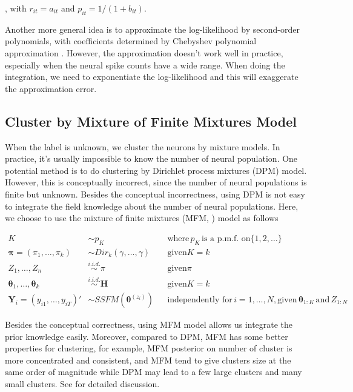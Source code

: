 \documentclass{article}
\begin{document}
	, with $r_{it} = a_{it}$ and $p_{it} = 1/(1 + b_{it})$.
	
	Another more general idea is to approximate the log-likelihood by second-order polynomials, with coefficients determined by Chebyshev polynomial approximation \citet{Keeley2019}. However, the approximation doesn’t work well in practice, especially when the neural spike counts have a wide range. When doing the integration, we need to exponentiate the log-likelihood and this will exaggerate the approximation error.
	
	\subsection{Cluster by Mixture of Finite Mixtures Model}
	When the label is unknown, we cluster the neurons by mixture models. In practice, it’s usually impossible to know the number of neural population. One potential method is to do clustering by Dirichlet process mixtures (DPM) model. However, this is conceptually incorrect, since the number of neural populations is finite but unknown. Besides the conceptual incorrectness, using DPM is not easy to integrate the field knowledge about the number of neural populations. Here, we choose to use the mixture of finite mixtures (MFM, \citet{Miller2018}) model as follows
	
	\begin{align*}
		K &\sim p_K &&\text{where}\, p_K \, \text{is a p.m.f. on} \{1,2,\ldots\}\\
		\bm{\pi}=(\pi_1,\ldots,\pi_k) &\sim Dir_k(\gamma, \ldots,\gamma) &&\text{given} K=k\\
		Z_1,\ldots,Z_n&\stackrel{i.i.d.}{\sim}\pi &&\text{given} \pi\\
		\bm{\theta}_1,\ldots,\bm{\theta}_k&\stackrel{i.i.d.}{\sim}\bm{H} &&\text{given} K=k\\
		\bm{Y}_i = (y_{i1},\ldots,y_{iT})' &\sim SSFM(\bm{\theta}^{(z_i)}) &&\text{independently for}\, i=1,\ldots,N, \text{given}\, \bm{\theta}_{1:K}\, \text{and}\, Z_{1:N}
	\end{align*}
	
	Besides the conceptual correctness, using MFM model allows us integrate the prior knowledge easily. Moreover, compared to DPM, MFM has some better properties for clustering, for example, MFM posterior on number of cluster is more concentrated and consistent, and MFM tend to give clusters size at the same order of magnitude while DPM may lead to a few large clusters and many small clusters. See \cite{Miller2018} for detailed discussion. 
	
\end{document}
